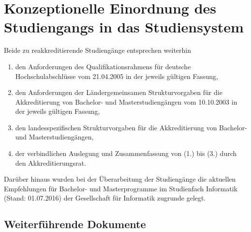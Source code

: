 \chapter{Konzeptionelle Einordnung des Studiengangs in das
Studiensystem}\label{konzeptionelle-einordnung-des-studiengangs-in-das-studiensystem}

Beide zu reakkreditierende Studiengänge entsprechen weiterhin

\begin{enumerate}
\def\labelenumi{\arabic{enumi}.}
\item
  den Anforderungen des Qualifikationsrahmens für deutsche
  Hochschulabschlüsse vom 21.04.2005 in der jeweils gültigen Fassung,
\item
  den Anforderungen der Ländergemeinsamen Strukturvorgaben für die
  Akkreditierung von Bachelor- und Masterstudiengängen vom 10.10.2003 in
  der jeweils gültigen Fassung,
\item
  den landesspezifischen Strukturvorgaben für die Akkreditierung von
  Bachelor- und Masterstudiengängen,
\item
  der verbindlichen Auslegung und Zusammenfassung von (1.) bis (3.)
  durch den Akkreditierungsrat.
\end{enumerate}

Darüber hinaus wurden bei der Überarbeitung der Studiengänge die
aktuellen Empfehlungen für Bachelor- und Masterprogramme im Studienfach
Informatik (Stand: 01.07.2016) der Gesellschaft für Informatik zugrunde
gelegt.

\section{Weiterführende
Dokumente}\label{weiterfuxfchrende-dokumente-2}

